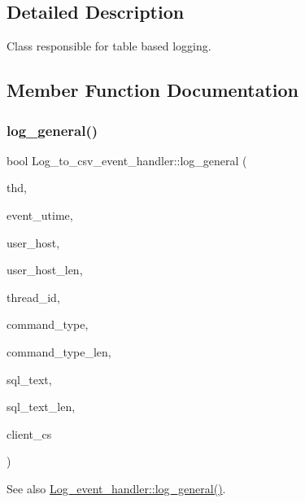 \subsection{Detailed Description}
Class responsible for table based logging. 

\subsection{Member Function Documentation}
\mbox{\label{classLog__to__csv__event__handler_a9e6adb8b8ca2c5d12dfb4a788f615d67}} 
\subsubsection{\texorpdfstring{log\+\_\+general()}{log\_general()}}
{\footnotesize\ttfamily bool Log\+\_\+to\+\_\+csv\+\_\+event\+\_\+handler\+::log\+\_\+general (\begin{DoxyParamCaption}\item[{T\+HD $\ast$}]{thd,  }\item[{ulonglong}]{event\+\_\+utime,  }\item[{const char $\ast$}]{user\+\_\+host,  }\item[{size\+\_\+t}]{user\+\_\+host\+\_\+len,  }\item[{my\+\_\+thread\+\_\+id}]{thread\+\_\+id,  }\item[{const char $\ast$}]{command\+\_\+type,  }\item[{size\+\_\+t}]{command\+\_\+type\+\_\+len,  }\item[{const char $\ast$}]{sql\+\_\+text,  }\item[{size\+\_\+t}]{sql\+\_\+text\+\_\+len,  }\item[{const C\+H\+A\+R\+S\+E\+T\+\_\+\+I\+N\+FO $\ast$}]{client\+\_\+cs }\end{DoxyParamCaption})\hspace{0.3cm}{\ttfamily [virtual]}}

\begin{DoxySeeAlso}{See also}
\mbox{\hyperlink{classLog__event__handler_aa9f98b8c0b48eb846877fe9d2496560e}{Log\+\_\+event\+\_\+handler\+::log\+\_\+general()}}. 
\end{DoxySeeAlso}


